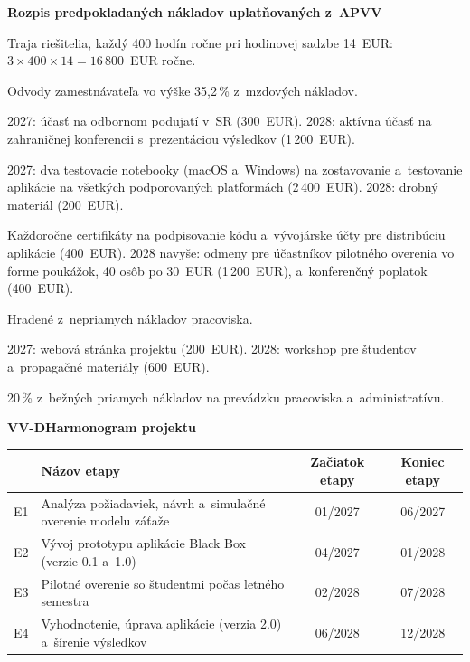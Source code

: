 \documentclass[10pt,a4paper]{article}
\newcommand{\cast}[2]{%
  \par\medskip
  \noindent\colorbox{black!10}{\parbox{\dimexpr\linewidth-2\fboxsep}{%
    \textbf{#1}\hfill\textbf{#2}}}\par\smallskip}
\begin{document}
\textbf{Rozpis predpokladaných nákladov uplatňovaných z~APVV}

\begin{description}[leftmargin=0pt,itemsep=2pt]
  \item[02 Mzdové náklady.] Traja riešitelia, každý 400 hodín ročne pri
    hodinovej sadzbe 14~EUR: $3 \times 400 \times 14 = 16\,800$~EUR ročne.
  \item[03 Poistenie.] Odvody zamestnávateľa vo výške 35,2\,\% z~mzdových
    nákladov.
  \item[04 Cestovné náklady.] 2027: účasť na odbornom podujatí v~SR
    (300~EUR). 2028: aktívna účasť na zahraničnej konferencii
    s~prezentáciou výsledkov (1\,200~EUR).
  \item[05 Materiál.] 2027: dva testovacie notebooky (macOS a~Windows) na
    zostavovanie a~testovanie aplikácie na všetkých podporovaných
    platformách (2\,400~EUR). 2028: drobný materiál (200~EUR).
  \item[06 Služby.] Každoročne certifikáty na podpisovanie kódu a~vývojárske
    účty pre distribúciu aplikácie (400~EUR). 2028 navyše: odmeny pre
    účastníkov pilotného overenia vo forme poukážok, 40 osôb po 30~EUR
    (1\,200~EUR), a~konferenčný poplatok (400~EUR).
  \item[07 Energie.] Hradené z~nepriamych nákladov pracoviska.
  \item[08 Popularizácia.] 2027: webová stránka projektu (200~EUR).
    2028: workshop pre študentov a~propagačné materiály (600~EUR).
  \item[09 Nepriame náklady.] 20\,\% z~bežných priamych nákladov
    na prevádzku pracoviska a~administratívu.
\end{description}

\cast{VV-D}{Harmonogram projektu}

\noindent
\begin{tabularx}{\linewidth}{|c|X|c|c|}
\hline
 & \textbf{Názov etapy} & \textbf{Začiatok etapy} & \textbf{Koniec etapy} \\ \hline
E1 & Analýza požiadaviek, návrh a~simulačné overenie modelu záťaže & 01/2027 & 06/2027 \\ \hline
E2 & Vývoj prototypu aplikácie Black Box (verzie 0.1 a~1.0) & 04/2027 & 01/2028 \\ \hline
E3 & Pilotné overenie so študentmi počas letného semestra & 02/2028 & 07/2028 \\ \hline
E4 & Vyhodnotenie, úprava aplikácie (verzia 2.0) a~šírenie výsledkov & 06/2028 & 12/2028 \\ \hline
\end{tabularx}
\end{document}
